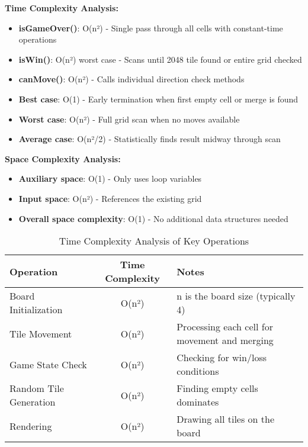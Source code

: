\documentclass[12pt, a4paper]{article}
\begin{document}
\textbf{Time Complexity Analysis:}
\begin{itemize}
    \item \textbf{isGameOver()}: O(n²) - Single pass through all cells with constant-time operations
    \item \textbf{isWin()}: O(n²) worst case - Scans until 2048 tile found or entire grid checked
    \item \textbf{canMove()}: O(n²) - Calls individual direction check methods
    \item \textbf{Best case}: O(1) - Early termination when first empty cell or merge is found
    \item \textbf{Worst case}: O(n²) - Full grid scan when no moves available
    \item \textbf{Average case}: O(n²/2) - Statistically finds result midway through scan
\end{itemize}

\textbf{Space Complexity Analysis:}
\begin{itemize}
    \item \textbf{Auxiliary space}: O(1) - Only uses loop variables
    \item \textbf{Input space}: O(n²) - References the existing grid
    \item \textbf{Overall space complexity}: O(1) - No additional data structures needed
\end{itemize}

%


\begin{table}[h]
\centering
\caption{Time Complexity Analysis of Key Operations}
\begin{tabular}{|l|c|l|}
\hline
\textbf{Operation} & \textbf{Time Complexity} & \textbf{Notes} \\
\hline
Board Initialization & O(n²) & n is the board size (typically 4) \\
\hline
Tile Movement & O(n²) & Processing each cell for movement and merging \\
\hline
Game State Check & O(n²) & Checking for win/loss conditions \\
\hline
Random Tile Generation & O(n²) & Finding empty cells dominates \\
\hline
Rendering & O(n²) & Drawing all tiles on the board \\
\hline
\end{tabular}
\end{table}
\end{document}
